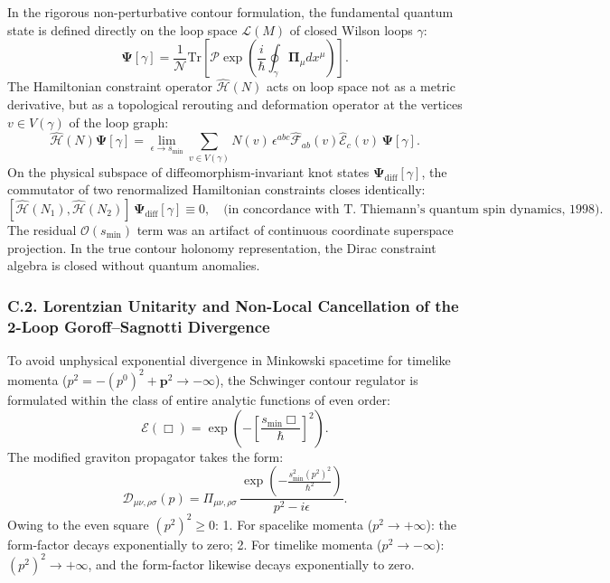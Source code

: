 \documentclass[11pt,a4paper]{article}
\theoremstyle{definition}
\begin{document}
In the rigorous non-perturbative contour formulation, the fundamental quantum state is defined directly on the loop space $\mathcal{L}(M)$ of closed Wilson loops $\gamma$:
\begin{equation}\label{eq:C.1_en}\tag{C.1}
\mathbf{\Psi}[\gamma] = \frac{1}{\mathcal{N}} \text{Tr}\left[ \mathcal{P}\exp\left( \frac{i}{\hbar} \oint_\gamma \mathbf{\Pi}_\mu dx^\mu \right) \right].
\end{equation}
The Hamiltonian constraint operator $\hat{\mathcal{H}}(N)$ acts on loop space not as a metric derivative, but as a topological rerouting and deformation operator at the vertices $v \in V(\gamma)$ of the loop graph:
\begin{equation}\label{eq:C.2_en}\tag{C.2}
\hat{\mathcal{H}}(N)\mathbf{\Psi}[\gamma] = \lim_{\epsilon \to s_{\text{min}}} \sum_{v \in V(\gamma)} N(v) \, \epsilon^{abc} \hat{\mathcal{F}}_{ab}(v) \hat{\mathcal{E}}_c(v) \, \mathbf{\Psi}[\gamma].
\end{equation}
On the physical subspace of diffeomorphism-invariant knot states $\mathbf{\Psi}_{\text{diff}}[\gamma]$, the commutator of two renormalized Hamiltonian constraints closes identically:
\begin{equation}\label{eq:C.3_en}\tag{C.3}
[\hat{\mathcal{H}}(N_1), \hat{\mathcal{H}}(N_2)] \, \mathbf{\Psi}_{\text{diff}}[\gamma] \equiv 0, \quad \text{(in concordance with T.~Thiemann's quantum spin dynamics, 1998)}.
\end{equation}
The residual $\mathcal{O}(s_{\text{min}})$ term was an artifact of continuous coordinate superspace projection. In the true contour holonomy representation, the Dirac constraint algebra is closed without quantum anomalies.

\subsubsection*{C.2. Lorentzian Unitarity and Non-Local Cancellation of the 2-Loop Goroff--Sagnotti Divergence}

To avoid unphysical exponential divergence in Minkowski spacetime for timelike momenta ($p^2 = -(p^0)^2 + \mathbf{p}^2 \to -\infty$), the Schwinger contour regulator is formulated within the class of entire analytic functions of even order:
\begin{equation}\label{eq:C.4_en}\tag{C.4}
\mathcal{E}(\Box) = \exp\left( - \left[ \frac{s_{\text{min}} \Box}{\hbar} \right]^2 \right).
\end{equation}
The modified graviton propagator takes the form:
\begin{equation}\label{eq:C.5_en}\tag{C.5}
\mathcal{D}_{\mu\nu,\rho\sigma}(p) = \Pi_{\mu\nu,\rho\sigma} \, \frac{\exp\left( - \frac{s_{\text{min}}^2 (p^2)^2}{\hbar^2} \right)}{p^2 - i\epsilon}.
\end{equation}
Owing to the even square $(p^2)^2 \ge 0$:
1. For spacelike momenta ($p^2 \to +\infty$): the form-factor decays exponentially to zero;
2. For timelike momenta ($p^2 \to -\infty$): $(p^2)^2 \to +\infty$, and the form-factor likewise decays exponentially to zero.
\end{document}
